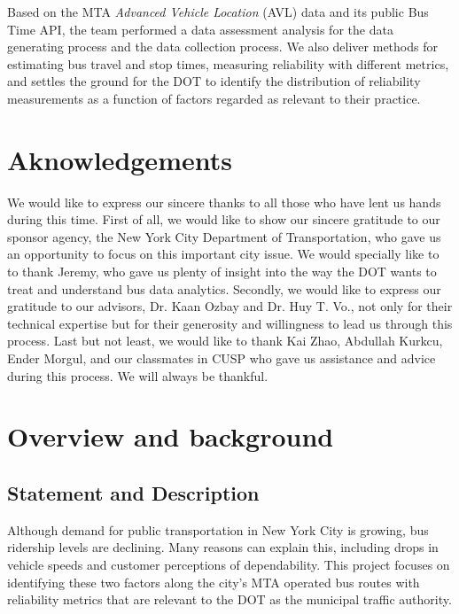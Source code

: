 \documentclass[12pt]{report}
\begin{document}
Based on the MTA \textit{Advanced Vehicle Location} (AVL) data and its public Bus Time API, the team performed a data assessment analysis for the data generating process and the data collection process. We also deliver methods for estimating bus travel and stop times, measuring reliability with different metrics, and settles the ground for the DOT to identify the distribution of reliability measurements as a function of factors regarded as relevant to their practice.
        
\section*{Aknowledgements}

We would like to express our sincere thanks to all those who have lent us hands during this time.  First of all, we would like to show our sincere gratitude to our sponsor agency, the New York City Department of Transportation, who gave us an opportunity to focus on this important city issue.  We would specially like to to thank Jeremy, who gave us plenty of insight into the way the DOT wants to treat and understand bus data analytics.  Secondly, we would like to express our gratitude to our advisors, Dr. Kaan Ozbay and Dr. Huy T. Vo., not only for their technical expertise but for their generosity and willingness to lead us through this process.  Last but not least, we would like to thank Kai Zhao, Abdullah Kurkcu, Ender Morgul, and our classmates in CUSP who gave us assistance and advice during this process.  We will always be thankful.


\newpage

\section{Overview and background}


\subsection{	Statement and Description}
Although demand for public transportation in New York City is growing, bus ridership levels are declining.  Many reasons can explain this, including drops in vehicle speeds and customer perceptions of dependability.  This project focuses on identifying these two factors along the city's MTA operated bus routes with reliability metrics that are relevant to the DOT as the municipal traffic authority.
\end{document}
